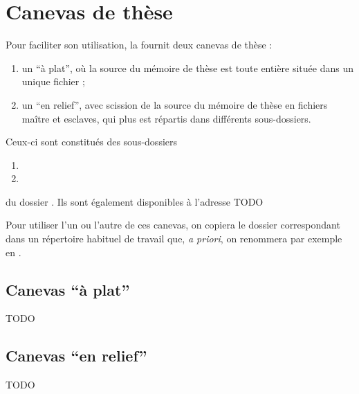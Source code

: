 \chapter{Canevas de thèse}\label{cha:canevas}

Pour faciliter son utilisation, la \yatcl fournit deux canevas de thèse :
\begin{enumerate}
\item un \enquote{à plat}, où la source  du mémoire de thèse est
  toute entière située dans un unique fichier ;
\item un \enquote{en relief}, avec scission de la source  du mémoire
  de thèse en fichiers maître et esclaves, qui plus est répartis dans
  différents sous-dossiers.
\end{enumerate}
Ceux-ci sont constitués des sous-dossiers
\begin{enumerate}
\item {}
\item {}
\end{enumerate}
du dossier . Ils sont également
disponibles à l'adresse TODO

Pour utiliser l'un ou l'autre de ces canevas, on copiera le dossier
correspondant dans un répertoire habituel de travail que, \emph{a
  priori}, on renommera par exemple en .

\section{Canevas  \enquote{à plat}}
\label{sec:canevas-a-plat}

TODO

\section{Canevas \enquote{en relief}}
\label{sec:canevas-relief}

TODO

%
\iffalse
\fi
